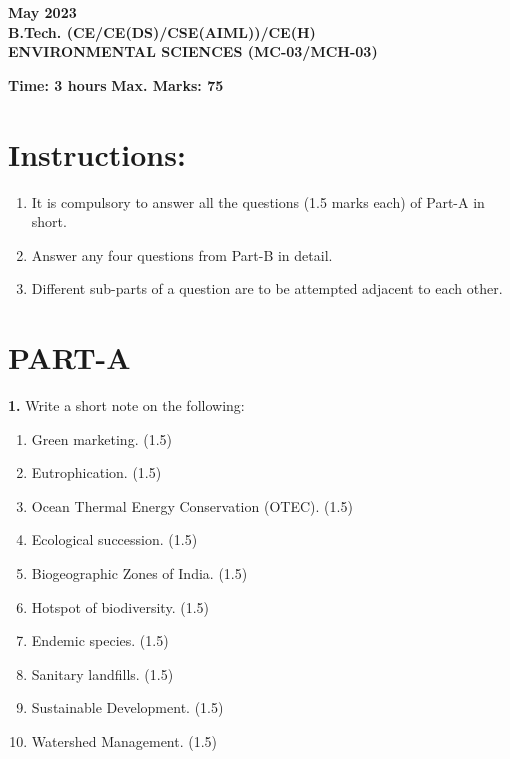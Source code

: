\documentclass[12pt,a4paper]{article}
\begin{document}
\pagecolor{readEra}

\begin{center}
    \textbf{May 2023} \\
    \textbf{B.Tech. (CE/CE(DS)/CSE(AIML))/CE(H)} \\
    \textbf{ENVIRONMENTAL SCIENCES (MC-03/MCH-03)}
\end{center}

\vspace{1em}

\noindent \textbf{Time: 3 hours} \hfill \textbf{Max. Marks: 75}

\vspace{1em}

\section*{Instructions:}
\begin{enumerate}[label=\arabic*.]
    \item It is compulsory to answer all the questions (1.5 marks each) of Part-A in short.
    \item Answer any four questions from Part-B in detail.
    \item Different sub-parts of a question are to be attempted adjacent to each other.
\end{enumerate}

\vspace{1em}

\section*{\textbf{PART-A}}

\noindent \textbf{1.} \quad Write a short note on the following:

\begin{enumerate}[label=(\alph*)]
    \item Green marketing. (1.5)
    \item Eutrophication. (1.5)
    \item Ocean Thermal Energy Conservation (OTEC). (1.5)
    \item Ecological succession. (1.5)
    \item Biogeographic Zones of India. (1.5)
    \item Hotspot of biodiversity. (1.5)
    \item Endemic species. (1.5)
    \item Sanitary landfills. (1.5)
    \item Sustainable Development. (1.5)
    \item Watershed Management. (1.5)
\end{enumerate}
\end{document}
